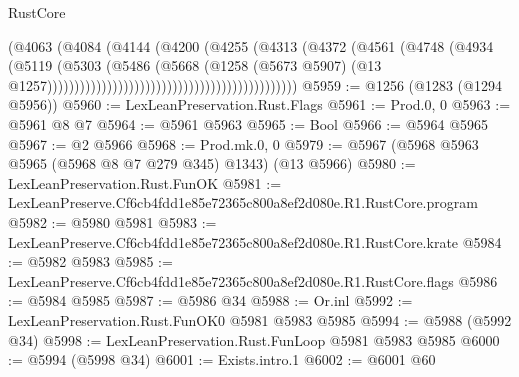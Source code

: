 \begin{lexlean}{RustCore}
\begin{coremodule}
                                                                (@4063
                                                                  (@4084
                                                                    (@4144
                                                                      (@4200
                                                                        (@4255
                                                                          (@4313
                                                                            (@4372
                                                                              (@4561
                                                                                (@4748
                                                                                  (@4934
                                                                                    (@5119
                                                                                      (@5303
                                                                                        (@5486
                                                                                          (@5668
                                                                                            (@1258
                                                                                              (@5673
                                                                                                @5907)
                                                                                              (@13
                                                                                                @1257))))))))))))))))))))))))))))))))))))))))))))))
@5959 := @1256 (@1283 (@1294 @5956))
@5960 := LexLeanPreservation.Rust.Flags
@5961 := Prod.{0, 0}
@5963 := @5961 @8 @7
@5964 := @5961 @5963
@5965 := Bool
@5966 := @5964 @5965
@5967 := @2 @5966
@5968 := Prod.mk.{0, 0}
@5979 := @5967 (@5968 @5963 @5965 (@5968 @8 @7 @279 @345) @1343) (@13 @5966)
@5980 := LexLeanPreservation.Rust.FunOK
@5981 := LexLeanPreserve.Cf6cb4fdd1e85e72365c800a8ef2d080e.R1.RustCore.program
@5982 := @5980 @5981
@5983 := LexLeanPreserve.Cf6cb4fdd1e85e72365c800a8ef2d080e.R1.RustCore.krate
@5984 := @5982 @5983
@5985 := LexLeanPreserve.Cf6cb4fdd1e85e72365c800a8ef2d080e.R1.RustCore.flags
@5986 := @5984 @5985
@5987 := @5986 @34
@5988 := Or.inl
@5992 := LexLeanPreservation.Rust.FunOK0 @5981 @5983 @5985
@5994 := @5988 (@5992 @34)
@5998 := LexLeanPreservation.Rust.FunLoop @5981 @5983 @5985
@6000 := @5994 (@5998 @34)
@6001 := Exists.intro.{1}
@6002 := @6001 @60

\end{coremodule}
\end{lexlean}
